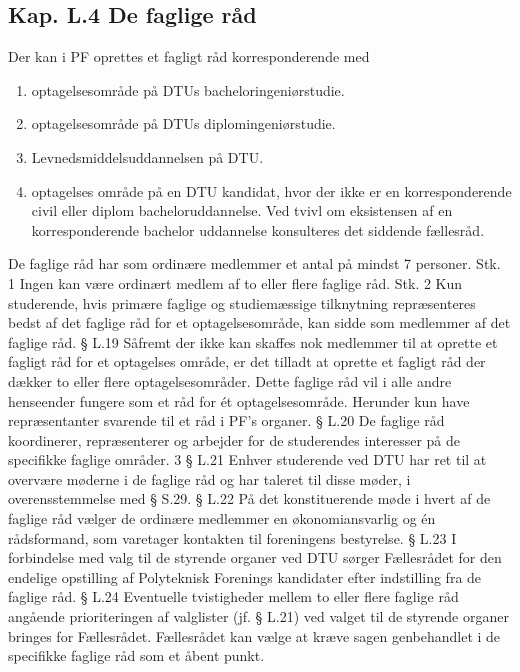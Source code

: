 \begin{list}
\subsection{Kap. L.4 De faglige råd}

\item Der kan i PF oprettes et fagligt råd korresponderende med
	\begin{enumerate}
	\item optagelsesområde på DTUs bacheloringeniørstudie.
	\item optagelsesområde på DTUs diplomingeniørstudie.
	\item Levnedsmiddelsuddannelsen på DTU.
	\item optagelses område på en DTU kandidat, hvor der ikke er en korresponderende civil eller diplom bacheloruddannelse. Ved tvivl om eksistensen af en korresponderende bachelor uddannelse konsulteres det siddende fællesråd.
	\end{enumerate}     
    
\item De faglige råd har som ordinære medlemmer et antal på mindst 7 personer.
Stk. 1 Ingen kan være ordinært medlem af to eller flere faglige råd.
Stk. 2 Kun studerende, hvis primære faglige og studiemæssige tilknytning repræsenteres bedst af det faglige
råd for et optagelsesområde, kan sidde som medlemmer af det faglige råd.
§ L.19 Såfremt der ikke kan skaffes nok medlemmer til at oprette et fagligt råd for et optagelses område, er det
          tilladt at oprette et fagligt råd der dækker to eller flere optagelsesområder. Dette faglige råd vil i alle andre
             henseender fungere som et råd for ét optagelsesområde. Herunder kun have repræsentanter svarende til et råd
                 i PF’s organer.
§ L.20 De faglige råd koordinerer, repræsenterer og arbejder for de studerendes interesser på de specifikke faglige
          områder.
3
§ L.21 Enhver studerende ved DTU har ret til at overvære møderne i de faglige råd og har taleret til disse møder, i
           overensstemmelse med § S.29.
§ L.22 På det konstituerende møde i hvert af de faglige råd vælger de ordinære medlemmer en økonomiansvarlig og
             én rådsformand, som varetager kontakten til foreningens bestyrelse.
§ L.23 I forbindelse med valg til de styrende organer ved DTU sørger Fællesrådet for den endelige opstilling af
          Polyteknisk Forenings kandidater efter indstilling fra de faglige råd.
§ L.24 Eventuelle tvistigheder mellem to eller flere faglige råd angående prioriteringen af valglister (jf. § L.21) ved
          valget til de styrende organer bringes for Fællesrådet. Fællesrådet kan vælge at kræve sagen genbehandlet i
               de specifikke faglige råd som et åbent punkt.

\end{list}
